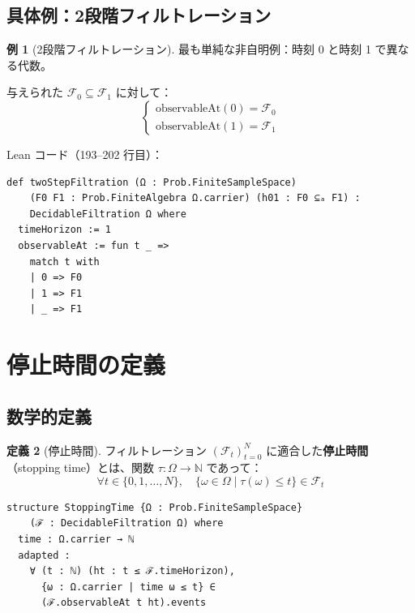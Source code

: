 \documentclass[12pt,a4paper,ja=standard]{bxjsarticle}
\theoremstyle{definition}
\newtheorem{definition}{定義}[section]
\newtheorem{example}[definition]{例}
\begin{document}
\subsection{具体例：2段階フィルトレーション}

\begin{example}[2段階フィルトレーション]
最も単純な非自明例：時刻 0 と時刻 1 で異なる代数。

与えられた $\mathcal{F}_0 \subseteq \mathcal{F}_1$ に対して：
\[
\begin{cases}
\text{observableAt}(0) = \mathcal{F}_0 \\
\text{observableAt}(1) = \mathcal{F}_1
\end{cases}
\]

Lean コード（193--202 行目）：
\begin{verbatim}
def twoStepFiltration (Ω : Prob.FiniteSampleSpace)
    (F0 F1 : Prob.FiniteAlgebra Ω.carrier) (h01 : F0 ⊆ₐ F1) :
    DecidableFiltration Ω where
  timeHorizon := 1
  observableAt := fun t _ =>
    match t with
    | 0 => F0
    | 1 => F1
    | _ => F1
\end{verbatim}
\end{example}

\section{停止時間の定義}\label{sec:stopping-time}

\subsection{数学的定義}

\begin{definition}[停止時間]
フィルトレーション $(\mathcal{F}_t)_{t=0}^N$ に適合した\textbf{停止時間}（stopping time）とは、関数 $\tau : \Omega \to \mathbb{N}$ であって：
\[
\forall t \in \{0, 1, \ldots, N\}, \quad \{\omega \in \Omega \mid \tau(\omega) \leq t\} \in \mathcal{F}_t
\]
\end{definition}

\begin{tcolorbox}[title=Lean コード（32--37 行目）]
\begin{verbatim}
structure StoppingTime {Ω : Prob.FiniteSampleSpace}
    (ℱ : DecidableFiltration Ω) where
  time : Ω.carrier → ℕ
  adapted :
    ∀ (t : ℕ) (ht : t ≤ ℱ.timeHorizon),
      {ω : Ω.carrier | time ω ≤ t} ∈ 
      (ℱ.observableAt t ht).events
\end{verbatim}
\end{tcolorbox}
\end{document}
